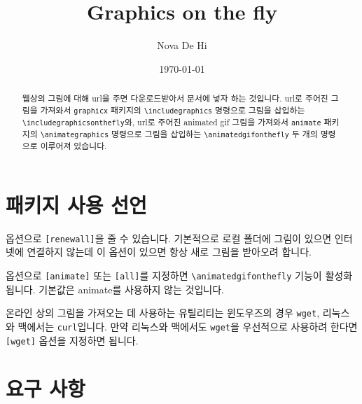 \documentclass[b5paper,nanum]{oblivoir}
\def\cs#1{\texttt{\textbackslash #1}}
\begin{document}
\title{Graphics on the fly}
\author{Nova De Hi}
\date{\today}

\maketitle

\begin{abstract}
웹상의 그림에 대해 url을 주면 다운로드받아서 문서에 넣자 하는 것입니다.
url로 주어진 그림을 가져와서 \texttt{graphicx} 패키지의 \cs{includegraphics} 명령으로
그림을 삽입하는 \cs{includegraphicsonthefly}와, url로 주어진 animated gif 그림을 가져와서
\texttt{animate} 패키지의 \cs{animategraphics} 명령으로 그림을 삽입하는 \cs{animatedgifonthefly} 두 개의 명령으로 이루어져 있습니다.
\end{abstract}

\tableofcontents*

\section{패키지 사용 선언}

\begin{boxedverbatim}
\usepackage[options]{graphicsonthefly}
\end{boxedverbatim}

옵션으로 \texttt{[renewall]}을 줄 수 있습니다. 기본적으로 로컬 폴더에 그림이 있으면 인터넷에 연결하지 않는데 이 옵션이 있으면 항상 새로 그림을 받아오려 합니다.

옵션으로 \texttt{[animate]} 또는 \texttt{[all]}를 지정하면 \cs{animatedgifonthefly} 기능이 활성화됩니다. 기본값은 animate를 사용하지 않는 것입니다.

온라인 상의 그림을 가져오는 데 사용하는 유틸리티는 윈도우즈의 경우 \texttt{wget}, 리눅스와 맥에서는 \texttt{curl}입니다. 만약 리눅스와 맥에서도 \texttt{wget}을 우선적으로 사용하려 한다면 \texttt{[wget]} 옵션을 지정하면 됩니다.

\section{요구 사항}
\end{document}
